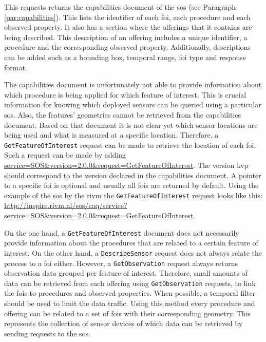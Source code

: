 This requests returns the capabilities document of the \ac{sos} (see Paragraph \ref{par:capabilities}). This lists the identifier of each \ac{foi}, each procedure and each observed property. It also has a section where the offerings that it contains are being described. This description of an offering includes a unique identifier, a procedure and the corresponding observed property. Additionally, descriptions can be added such as a bounding box, temporal range, \ac{foi} type and response format.  

\begin{sloppypar}
	The capabilities document is unfortunately not able to provide information about which procedure is being applied for which feature of interest. This is crucial information for knowing which deployed sensors can be queried using a particular \ac{sos}. Also, the features' geometries cannot be retrieved from the capabilities document. Based on that document it is not clear yet which sensor locations are being used and what is measured at a specific location. Therefore, a \texttt{GetFeatureOfInterest} request can be made to retrieve the location of each \ac{foi}. Such a request can be made by adding \url{service=SOS&version=2.0.0&request=GetFeatureOfInterest}. The version \ac{kvp} should correspond to the version declared in the capabilities document. A pointer to a specific \ac{foi} is optional and usually all \acp{foi} are returned by default. Using the example of the \ac{sos} by the \ac{rivm} the \texttt{GetFeatureOfInterest} request looks like this: \url{http://inspire.rivm.nl/sos/eaq/service?service=SOS&version=2.0.0&request=GetFeatureOfInterest}.
\end{sloppypar}

On the one hand, a \texttt{GetFeatureOfInterest} document does not necessarily provide information about the procedures that are related to a certain feature of interest. On the other hand, a \texttt{DescribeSensor} request does not always relate the process to a \ac{foi} either. However, a \texttt{GetObservation} request always returns observation data grouped per feature of interest. Therefore, small amounts of data can be retrieved from each offering using \texttt{GetObservation} requests, to link the \acp{foi} to procedures and observed properties. When possible, a temporal filter should be used to limit the data traffic. Using this method every procedure and offering can be related to a set of \acp{foi} with their corresponding geometry. This represents the collection of sensor devices of which data can be retrieved by sending requests to the \ac{sos}. 


